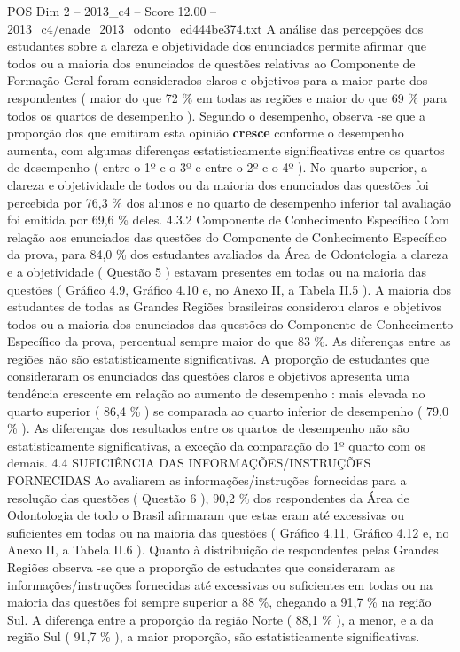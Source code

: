 \begin{textsample}{POS Dim 2 – 2013\_c4 – Score 12.00 – 2013\_c4/enade\_2013\_odonto\_ed444be374.txt}
A análise das percepções dos estudantes sobre a clareza e objetividade dos enunciados permite afirmar que todos ou a maioria dos enunciados de questões relativas ao Componente de Formação Geral foram considerados claros e objetivos para a maior parte dos respondentes ( maior do que 72 \% em todas as regiões e maior do que 69 \% para todos os quartos de desempenho ).
Segundo o desempenho, observa -se que a proporção dos que emitiram esta opinião \textbf{cresce} conforme o desempenho aumenta, com algumas diferenças estatisticamente significativas entre os quartos de desempenho ( entre o 1º e o 3º e entre o 2º e o 4º ).
No quarto superior, a clareza e objetividade de todos ou da maioria dos enunciados das questões foi percebida por 76,3 \% dos alunos e no quarto de desempenho inferior tal avaliação foi emitida por 69,6 \% deles. 4.3.2 Componente de Conhecimento Específico Com relação aos enunciados das questões do Componente de Conhecimento Específico da prova, para 84,0 \% dos estudantes avaliados da Área de Odontologia a clareza e a objetividade ( Questão 5 ) estavam presentes em todas ou na maioria das questões ( Gráfico 4.9, Gráfico 4.10 e, no Anexo II, a Tabela II.5 ).
A maioria dos estudantes de todas as Grandes Regiões brasileiras considerou claros e objetivos todos ou a maioria dos enunciados das questões do Componente de Conhecimento Específico da prova, percentual sempre maior do que 83 \%.
As diferenças entre as regiões não são estatisticamente significativas.
A proporção de estudantes que consideraram os enunciados das questões claros e objetivos apresenta uma tendência crescente em relação ao aumento de desempenho : mais elevada no quarto superior ( 86,4 \% ) se comparada ao quarto inferior de desempenho ( 79,0 \% ).
As diferenças dos resultados entre os quartos de desempenho não são estatisticamente significativas, a exceção da comparação do 1º quarto com os demais. 4.4 SUFICIÊNCIA DAS INFORMAÇÕES/INSTRUÇÕES FORNECIDAS Ao avaliarem as informações/instruções fornecidas para a resolução das questões ( Questão 6 ), 90,2 \% dos respondentes da Área de Odontologia de todo o Brasil afirmaram que estas eram até excessivas ou suficientes em todas ou na maioria das questões ( Gráfico 4.11, Gráfico 4.12 e, no Anexo II, a Tabela II.6 ).
Quanto à distribuição de respondentes pelas Grandes Regiões observa -se que a proporção de estudantes que consideraram as informações/instruções fornecidas até excessivas ou suficientes em todas ou na maioria das questões foi sempre superior a 88 \%, chegando a 91,7 \% na região Sul.
A diferença entre a proporção da região Norte ( 88,1 \% ), a menor, e a da região Sul ( 91,7 \% ), a maior proporção, são estatisticamente significativas.

\end{textsample}
